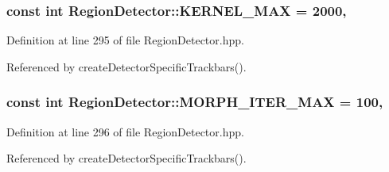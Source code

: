 \hypertarget{classmultiscale_1_1analysis_1_1RegionDetector_aa988e3458f774c489e03e3f8bd0db1ed}{
\subsubsection[{K\-E\-R\-N\-E\-L\-\_\-\-M\-A\-X}]{\setlength{\rightskip}{0pt plus 5cm}const int Region\-Detector\-::\-K\-E\-R\-N\-E\-L\-\_\-\-M\-A\-X = 2000\hspace{0.3cm}{\ttfamily [static]}, {\ttfamily [private]}}}\label{classmultiscale_1_1analysis_1_1RegionDetector_aa988e3458f774c489e03e3f8bd0db1ed}


Definition at line 295 of file Region\-Detector.\-hpp.



Referenced by create\-Detector\-Specific\-Trackbars().

\hypertarget{classmultiscale_1_1analysis_1_1RegionDetector_adeaa40a86b09bad2530bf179cbb4e602}{
\subsubsection[{M\-O\-R\-P\-H\-\_\-\-I\-T\-E\-R\-\_\-\-M\-A\-X}]{\setlength{\rightskip}{0pt plus 5cm}const int Region\-Detector\-::\-M\-O\-R\-P\-H\-\_\-\-I\-T\-E\-R\-\_\-\-M\-A\-X = 100\hspace{0.3cm}{\ttfamily [static]}, {\ttfamily [private]}}}\label{classmultiscale_1_1analysis_1_1RegionDetector_adeaa40a86b09bad2530bf179cbb4e602}


Definition at line 296 of file Region\-Detector.\-hpp.



Referenced by create\-Detector\-Specific\-Trackbars().

